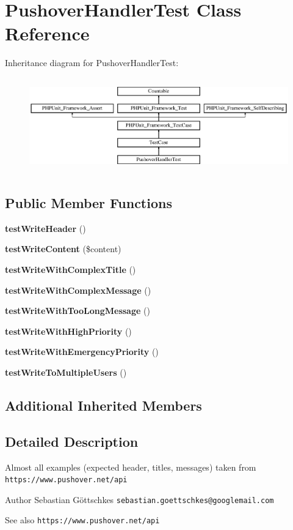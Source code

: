 \section{Pushover\+Handler\+Test Class Reference}
\label{class_monolog_1_1_handler_1_1_pushover_handler_test}
Inheritance diagram for Pushover\+Handler\+Test\+:\begin{figure}[H]
\begin{center}
\leavevmode
\includegraphics[height=4.129793cm]{class_monolog_1_1_handler_1_1_pushover_handler_test}
\end{center}
\end{figure}
\subsection*{Public Member Functions}
\begin{DoxyCompactItemize}
\item 
{\bf test\+Write\+Header} ()
\item 
{\bf test\+Write\+Content} (\$content)
\item 
{\bf test\+Write\+With\+Complex\+Title} ()
\item 
{\bf test\+Write\+With\+Complex\+Message} ()
\item 
{\bf test\+Write\+With\+Too\+Long\+Message} ()
\item 
{\bf test\+Write\+With\+High\+Priority} ()
\item 
{\bf test\+Write\+With\+Emergency\+Priority} ()
\item 
{\bf test\+Write\+To\+Multiple\+Users} ()
\end{DoxyCompactItemize}
\subsection*{Additional Inherited Members}


\subsection{Detailed Description}
Almost all examples (expected header, titles, messages) taken from {\tt https\+://www.\+pushover.\+net/api} \begin{DoxyAuthor}{Author}
Sebastian Göttschkes {\tt sebastian.\+goettschkes@googlemail.\+com} 
\end{DoxyAuthor}
\begin{DoxySeeAlso}{See also}
{\tt https\+://www.\+pushover.\+net/api} 
\end{DoxySeeAlso}


